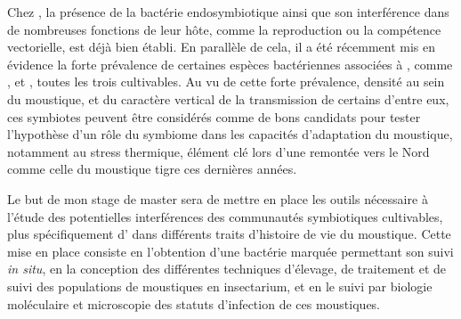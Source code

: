 Chez , la présence de la bactérie endosymbiotique  ainsi que son interférence dans de nombreuses fonctions de leur hôte, comme la reproduction ou la compétence vectorielle, est déjà bien établi.
En parallèle de cela, il a été récemment mis en évidence la forte prévalence de certaines espèces bactériennes associées à , comme ,  et , toutes les trois cultivables.
Au vu de cette forte prévalence, densité au sein du moustique, et du caractère vertical de la transmission de certains d'entre eux, ces symbiotes peuvent être considérés comme de bons candidats pour tester l'hypothèse d'un rôle du symbiome dans les capacités d'adaptation du moustique, notamment au stress thermique, élément clé lors d'une remontée vers le Nord comme celle du moustique tigre ces dernières années.

Le but de mon stage de master sera de mettre en place les outils nécessaire à l'étude des potentielles interférences des communautés symbiotiques cultivables, plus spécifiquement d' dans différents traits d'histoire de vie du moustique. 
Cette mise en place consiste en l'obtention d'une bactérie marquée permettant son suivi \textit{in situ}, en la conception des différentes techniques d'élevage, de traitement et de suivi des populations de moustiques en insectarium, et en le suivi par biologie moléculaire et microscopie des statuts d'infection de ces moustiques.